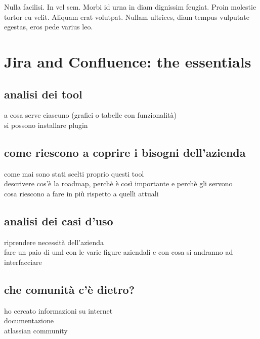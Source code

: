 \begin{savequote}[75mm]
Nulla facilisi. In vel sem. Morbi id urna in diam dignissim feugiat. Proin molestie tortor eu velit. Aliquam erat volutpat. Nullam ultrices, diam tempus vulputate egestas, eros pede varius leo.
\end{savequote}

\chapter{Jira and Confluence: the essentials}


\section{analisi dei tool}
a cosa serve ciascuno (grafici o tabelle con funzionalità)\\
si possono installare plugin

\section{come riescono a coprire i bisogni dell'azienda}
come mai sono stati scelti proprio questi tool\\
descrivere cos'è la roadmap, perchè è così importante e perchè gli servono\\
cosa riescono a fare in più rispetto a quelli attuali

\section{analisi dei casi d'uso}
riprendere necessità dell'azienda\\
fare un paio di uml con le varie figure aziendali e con cosa si andranno ad interfacciare

\section{che comunità c'è dietro?}
ho cercato informazioni su internet\\
documentazione\\
atlassian community
